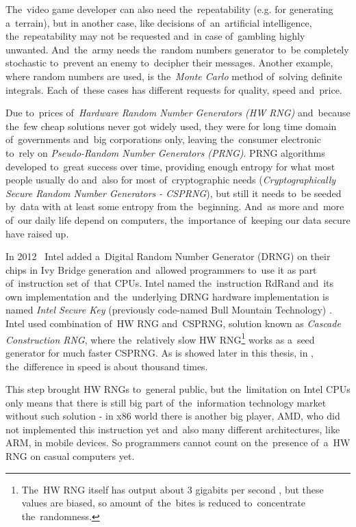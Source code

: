 \par{
The~video game developer can also need the~repeatability (e.g. for generating 
a~terrain), but in another case, like decisions of~an~artificial intelligence, 
the~repeatability may not be requested and~in case of~gambling highly unwanted. 
And~the~army needs the~random numbers generator to~be completely stochastic 
to~prevent an enemy to~decipher their messages. Another example, where random 
numbers are used, is the~{\em Monte Carlo} method of~solving definite integrals. 
Each of~these cases has different requests for quality, speed and~price.
}

\par{
Due to~prices of~{\em Hardware Random Number Generators (HW RNG)} 
and~because the~few cheap solutions never got widely used, 
they were for long time domain of~governments and~big corporations only,
leaving the~consumer electronic to~rely on {\em Pseudo-Random Number 
Generators (PRNG)}. PRNG algorithms developed to~great success over time, 
providing enough entropy for what most people usually do and~also for most 
of~cryptographic needs ({\em Cryptographically Secure Random Number 
Generators - CSPRNG}), but still it needs to~be seeded by~data with at least 
some entropy from the~beginning. And~as more and~more of~our daily life 
depend on computers, the~importance of~keeping our data secure have 
raised up. 
}

\par{
In 2012~\cite{IntelRdRandFindAbout} Intel added a~Digital Random Number 
Generator (DRNG) on their chips in Ivy Bridge generation
and~allowed programmers to~use it as part 
of~instruction set of~that CPUs. Intel named the~instruction RdRand and~its own 
implementation and~the~underlying DRNG hardware implementation is named 
{\em Intel Secure Key} (previously code-named Bull Mountain Technology)
\cite{IntelDRNGAnalysis}. Intel used combination of~HW RNG and~CSPRNG, 
solution known as {\em Cascade Construction RNG}, where the~relatively slow 
HW RNG\footnote{The~HW RNG itself has output about 3 gigabits per second
\cite{BehindRdRand}, but these values are biased, so amount of~the~bites 
is reduced to~concentrate the~randomness.} works as a~seed generator 
for much faster CSPRNG. As is showed later in this thesis, 
in , the~difference in speed 
is about thousand times.
}

\par{
This step brought HW RNGs to~general public, but the~limitation on Intel 
CPUs only means that there is still big part of~the~information technology market 
without such solution - in x86 world there is another big player, 
AMD, who did not implemented this instruction yet and~also many 
different architectures, like ARM, in mobile devices. 
So programmers cannot count on the~presence of~a~HW RNG 
on casual computers yet. 
}

